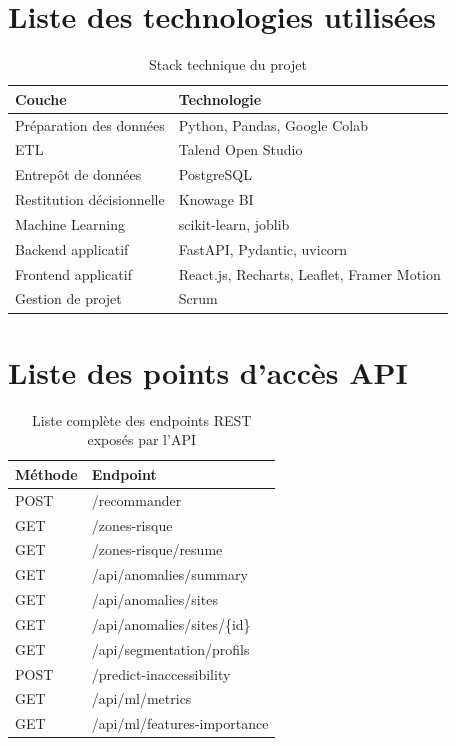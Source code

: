\section{Liste des technologies utilisées}
\begin{table}[H]
\centering
\caption{Stack technique du projet}
\begin{tabular}{ll}
\toprule
\textbf{Couche} & \textbf{Technologie} \\
\midrule
Préparation des données & Python, Pandas, Google Colab \\
ETL & Talend Open Studio \\
Entrepôt de données & PostgreSQL \\
Restitution décisionnelle & Knowage BI \\
Machine Learning & scikit-learn, joblib \\
Backend applicatif & FastAPI, Pydantic, uvicorn \\
Frontend applicatif & React.js, Recharts, Leaflet, Framer Motion \\
Gestion de projet & Scrum \\
\bottomrule
\end{tabular}
\end{table}

\section{Liste des points d'accès API}
\begin{table}[H]
\centering
\caption{Liste complète des endpoints REST exposés par l'API}
\begin{tabular}{ll}
\toprule
\textbf{Méthode} & \textbf{Endpoint} \\
\midrule
POST & /recommander \\
GET & /zones-risque \\
GET & /zones-risque/resume \\
GET & /api/anomalies/summary \\
GET & /api/anomalies/sites \\
GET & /api/anomalies/sites/\{id\} \\
GET & /api/segmentation/profils \\
POST & /predict-inaccessibility \\
GET & /api/ml/metrics \\
GET & /api/ml/features-importance \\
\bottomrule
\end{tabular}
\end{table}
